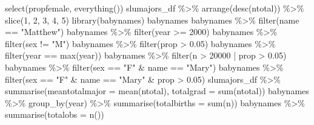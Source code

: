 \documentclass[
]{book}
\newenvironment{Shaded}{\begin{snugshade}}{\end{snugshade}}
\newcommand{\AttributeTok}[1]{\textcolor[rgb]{0.77,0.63,0.00}{#1}}
\newcommand{\DecValTok}[1]{\textcolor[rgb]{0.00,0.00,0.81}{#1}}
\newcommand{\FloatTok}[1]{\textcolor[rgb]{0.00,0.00,0.81}{#1}}
\newcommand{\FunctionTok}[1]{\textcolor[rgb]{0.00,0.00,0.00}{#1}}
\newcommand{\NormalTok}[1]{#1}
\newcommand{\SpecialCharTok}[1]{\textcolor[rgb]{0.00,0.00,0.00}{#1}}
\newcommand{\StringTok}[1]{\textcolor[rgb]{0.31,0.60,0.02}{#1}}
\begin{document}
\begin{Shaded}
\begin{Highlighting}[]
  \FunctionTok{select}\NormalTok{(propfemale, }\FunctionTok{everything}\NormalTok{())}
\NormalTok{slumajors\_df }\SpecialCharTok{\%\textgreater{}\%} \FunctionTok{arrange}\NormalTok{(}\FunctionTok{desc}\NormalTok{(ntotal)) }\SpecialCharTok{\%\textgreater{}\%}
  \FunctionTok{slice}\NormalTok{(}\DecValTok{1}\NormalTok{, }\DecValTok{2}\NormalTok{, }\DecValTok{3}\NormalTok{, }\DecValTok{4}\NormalTok{, }\DecValTok{5}\NormalTok{)}
\FunctionTok{library}\NormalTok{(babynames)}
\NormalTok{babynames}
\NormalTok{babynames }\SpecialCharTok{\%\textgreater{}\%} \FunctionTok{filter}\NormalTok{(name }\SpecialCharTok{==} \StringTok{"Matthew"}\NormalTok{)}
\NormalTok{babynames }\SpecialCharTok{\%\textgreater{}\%} \FunctionTok{filter}\NormalTok{(year }\SpecialCharTok{\textgreater{}=} \DecValTok{2000}\NormalTok{)}
\NormalTok{babynames }\SpecialCharTok{\%\textgreater{}\%} \FunctionTok{filter}\NormalTok{(sex }\SpecialCharTok{!=} \StringTok{"M"}\NormalTok{)}
\NormalTok{babynames }\SpecialCharTok{\%\textgreater{}\%} \FunctionTok{filter}\NormalTok{(prop }\SpecialCharTok{\textgreater{}} \FloatTok{0.05}\NormalTok{)}
\NormalTok{babynames }\SpecialCharTok{\%\textgreater{}\%} \FunctionTok{filter}\NormalTok{(year }\SpecialCharTok{==} \FunctionTok{max}\NormalTok{(year))}
\NormalTok{babynames }\SpecialCharTok{\%\textgreater{}\%} \FunctionTok{filter}\NormalTok{(n }\SpecialCharTok{\textgreater{}} \DecValTok{20000} \SpecialCharTok{|}\NormalTok{ prop }\SpecialCharTok{\textgreater{}} \FloatTok{0.05}\NormalTok{)}
\NormalTok{babynames }\SpecialCharTok{\%\textgreater{}\%} \FunctionTok{filter}\NormalTok{(sex }\SpecialCharTok{==} \StringTok{"F"} \SpecialCharTok{\&}\NormalTok{ name }\SpecialCharTok{==} \StringTok{"Mary"}\NormalTok{)}
\NormalTok{babynames }\SpecialCharTok{\%\textgreater{}\%} \FunctionTok{filter}\NormalTok{(sex }\SpecialCharTok{==} \StringTok{"F"} \SpecialCharTok{\&}\NormalTok{ name }\SpecialCharTok{==} \StringTok{"Mary"} \SpecialCharTok{\&}\NormalTok{ prop }\SpecialCharTok{\textgreater{}} \FloatTok{0.05}\NormalTok{)}
\NormalTok{slumajors\_df }\SpecialCharTok{\%\textgreater{}\%}
  \FunctionTok{summarise}\NormalTok{(}\AttributeTok{meantotalmajor =} \FunctionTok{mean}\NormalTok{(ntotal),}
            \AttributeTok{totalgrad =} \FunctionTok{sum}\NormalTok{(ntotal))}
\NormalTok{babynames }\SpecialCharTok{\%\textgreater{}\%} \FunctionTok{group\_by}\NormalTok{(year) }\SpecialCharTok{\%\textgreater{}\%}
  \FunctionTok{summarise}\NormalTok{(}\AttributeTok{totalbirths =} \FunctionTok{sum}\NormalTok{(n))}
\NormalTok{babynames }\SpecialCharTok{\%\textgreater{}\%} \FunctionTok{summarise}\NormalTok{(}\AttributeTok{totalobs =} \FunctionTok{n}\NormalTok{())}

\end{Highlighting}
\end{Shaded}
\end{document}
